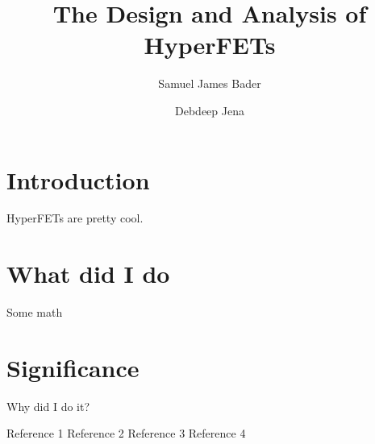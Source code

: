 
\title{The Design and Analysis of HyperFETs}

\author[1]{Samuel James Bader}
\author[2]{Debdeep Jena}


\maketitle
\thispagestyle{empty}

\ifdoublecol\begin{multicols}{2}\fi

\section*{Introduction}
HyperFETs are pretty cool.

\section*{What did I do}
Some math

\section*{Significance}
Why did I do it?


\ifdoublecol\end{multicols}\fi

\vfill

\setlength{\multicolsep}{0em}
\begin{multicols}{2}
{\fontsize{9pt}{9pt}\selectfont

\frenchspacing

\renewcommand{\section}[2]{}
\begin{thebibliography}{9} 

Reference 1
Reference 2
Reference 3
Reference 4

\end{thebibliography}
}
\end{multicols}


